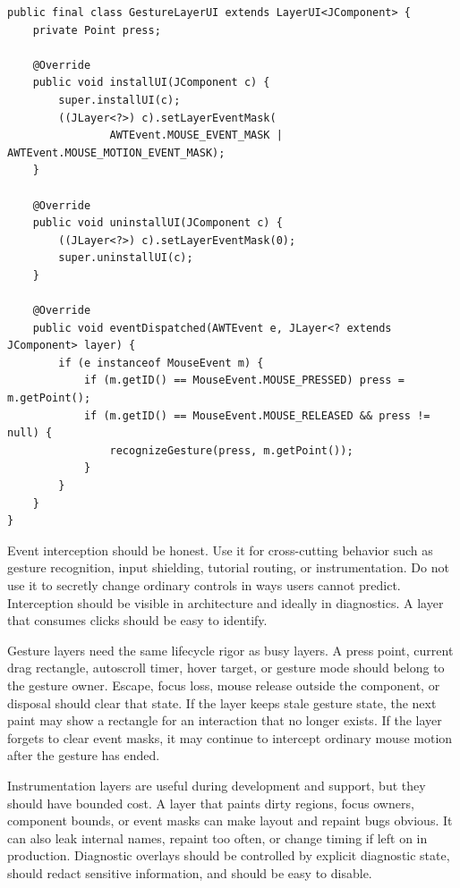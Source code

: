 \begin{lstlisting}[caption={Recognizing a mouse gesture at the layer boundary.}]
public final class GestureLayerUI extends LayerUI<JComponent> {
    private Point press;

    @Override
    public void installUI(JComponent c) {
        super.installUI(c);
        ((JLayer<?>) c).setLayerEventMask(
                AWTEvent.MOUSE_EVENT_MASK | AWTEvent.MOUSE_MOTION_EVENT_MASK);
    }

    @Override
    public void uninstallUI(JComponent c) {
        ((JLayer<?>) c).setLayerEventMask(0);
        super.uninstallUI(c);
    }

    @Override
    public void eventDispatched(AWTEvent e, JLayer<? extends JComponent> layer) {
        if (e instanceof MouseEvent m) {
            if (m.getID() == MouseEvent.MOUSE_PRESSED) press = m.getPoint();
            if (m.getID() == MouseEvent.MOUSE_RELEASED && press != null) {
                recognizeGesture(press, m.getPoint());
            }
        }
    }
}
\end{lstlisting}

Event interception should be honest. Use it for cross-cutting behavior such as gesture recognition, input shielding, tutorial routing, or instrumentation. Do not use it to secretly change ordinary controls in ways users cannot predict. Interception should be visible in architecture and ideally in diagnostics. A layer that consumes clicks should be easy to identify.

Gesture layers need the same lifecycle rigor as busy layers. A press point,
current drag rectangle, autoscroll timer, hover target, or gesture mode should
belong to the gesture owner. Escape, focus loss, mouse release outside the
component, or disposal should clear that state. If the layer keeps stale gesture
state, the next paint may show a rectangle for an interaction that no longer
exists. If the layer forgets to clear event masks, it may continue to intercept
ordinary mouse motion after the gesture has ended.

Instrumentation layers are useful during development and support, but they
should have bounded cost. A layer that paints dirty regions, focus owners,
component bounds, or event masks can make layout and repaint bugs obvious. It
can also leak internal names, repaint too often, or change timing if left on in
production. Diagnostic overlays should be controlled by explicit diagnostic
state, should redact sensitive information, and should be easy to disable.

